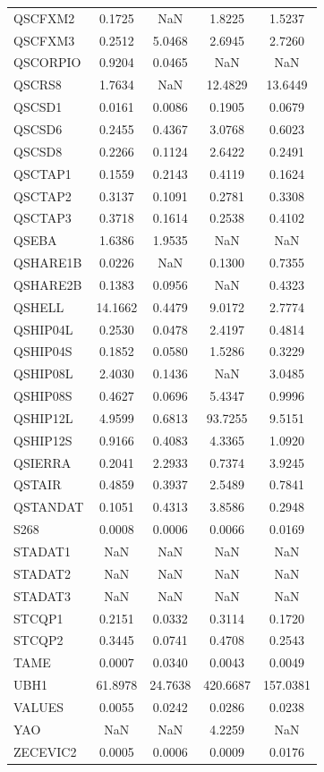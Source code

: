 \begin{longtable}{lcccc}
QSCFXM2  &   0.1725 &      NaN &   1.8225 &   1.5237 \\
QSCFXM3  &   0.2512 &   5.0468 &   2.6945 &   2.7260 \\
QSCORPIO &   0.9204 &   0.0465 &      NaN &      NaN \\
QSCRS8   &   1.7634 &      NaN &  12.4829 &  13.6449 \\
QSCSD1   &   0.0161 &   0.0086 &   0.1905 &   0.0679 \\
QSCSD6   &   0.2455 &   0.4367 &   3.0768 &   0.6023 \\
QSCSD8   &   0.2266 &   0.1124 &   2.6422 &   0.2491 \\
QSCTAP1  &   0.1559 &   0.2143 &   0.4119 &   0.1624 \\
QSCTAP2  &   0.3137 &   0.1091 &   0.2781 &   0.3308 \\
QSCTAP3  &   0.3718 &   0.1614 &   0.2538 &   0.4102 \\
QSEBA    &   1.6386 &   1.9535 &      NaN &      NaN \\
QSHARE1B &   0.0226 &      NaN &   0.1300 &   0.7355 \\
QSHARE2B &   0.1383 &   0.0956 &      NaN &   0.4323 \\
QSHELL   &  14.1662 &   0.4479 &   9.0172 &   2.7774 \\
QSHIP04L &   0.2530 &   0.0478 &   2.4197 &   0.4814 \\
QSHIP04S &   0.1852 &   0.0580 &   1.5286 &   0.3229 \\
QSHIP08L &   2.4030 &   0.1436 &      NaN &   3.0485 \\
QSHIP08S &   0.4627 &   0.0696 &   5.4347 &   0.9996 \\
QSHIP12L &   4.9599 &   0.6813 &  93.7255 &   9.5151 \\
QSHIP12S &   0.9166 &   0.4083 &   4.3365 &   1.0920 \\
QSIERRA  &   0.2041 &   2.2933 &   0.7374 &   3.9245 \\
QSTAIR   &   0.4859 &   0.3937 &   2.5489 &   0.7841 \\
QSTANDAT &   0.1051 &   0.4313 &   3.8586 &   0.2948 \\
S268     &   0.0008 &   0.0006 &   0.0066 &   0.0169 \\
STADAT1  &      NaN &      NaN &      NaN &      NaN \\
STADAT2  &      NaN &      NaN &      NaN &      NaN \\
STADAT3  &      NaN &      NaN &      NaN &      NaN \\
STCQP1   &   0.2151 &   0.0332 &   0.3114 &   0.1720 \\
STCQP2   &   0.3445 &   0.0741 &   0.4708 &   0.2543 \\
TAME     &   0.0007 &   0.0340 &   0.0043 &   0.0049 \\
UBH1     &  61.8978 &  24.7638 & 420.6687 & 157.0381 \\
VALUES   &   0.0055 &   0.0242 &   0.0286 &   0.0238 \\
YAO      &      NaN &      NaN &   4.2259 &      NaN \\
ZECEVIC2 &   0.0005 &   0.0006 &   0.0009 &   0.0176 \\
\end{longtable}
